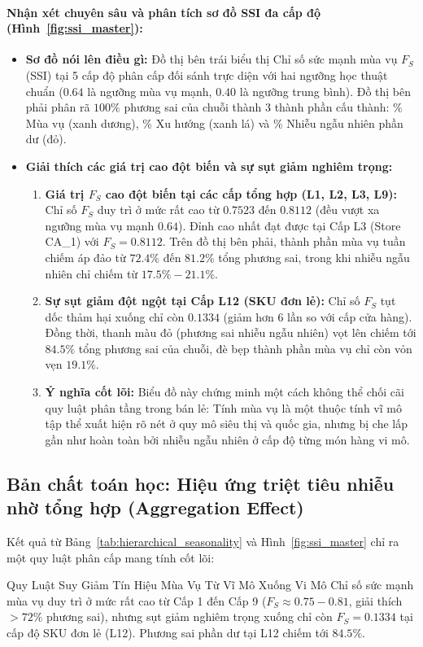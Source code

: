 \documentclass[12pt,a4paper,oneside]{article}
\begin{document}
\paragraph{Nhận xét chuyên sâu và phân tích sơ đồ SSI đa cấp độ (Hình~\ref{fig:ssi_master}):}
\begin{itemize}
    \item \textbf{Sơ đồ nói lên điều gì:} Đồ thị bên trái biểu thị Chỉ số sức mạnh mùa vụ $F_S$ (SSI) tại 5 cấp độ phân cấp đối sánh trực diện với hai ngưỡng học thuật chuẩn ($0.64$ là ngưỡng mùa vụ mạnh, $0.40$ là ngưỡng trung bình). Đồ thị bên phải phân rã $100\%$ phương sai của chuỗi thành 3 thành phần cấu thành: \% Mùa vụ (xanh dương), \% Xu hướng (xanh lá) và \% Nhiễu ngẫu nhiên phần dư (đỏ).
    \item \textbf{Giải thích các giá trị cao đột biến và sự sụt giảm nghiêm trọng:}
    \begin{enumerate}
        \item \textbf{Giá trị $F_S$ cao đột biến tại các cấp tổng hợp (L1, L2, L3, L9):} Chỉ số $F_S$ duy trì ở mức rất cao từ $0.7523$ đến $0.8112$ (đều vượt xa ngưỡng mùa vụ mạnh $0.64$). Đỉnh cao nhất đạt được tại Cấp L3 (Store CA\_1) với $F_S = 0.8112$. Trên đồ thị bên phải, thành phần mùa vụ tuần chiếm áp đảo từ $72.4\%$ đến $81.2\%$ tổng phương sai, trong khi nhiễu ngẫu nhiên chỉ chiếm từ $17.5\% - 21.1\%$.
        \item \textbf{Sự sụt giảm đột ngột tại Cấp L12 (SKU đơn lẻ):} Chỉ số $F_S$ tụt dốc thảm hại xuống chỉ còn $0.1334$ (giảm hơn 6 lần so với cấp cửa hàng). Đồng thời, thanh màu đỏ (phương sai nhiễu ngẫu nhiên) vọt lên chiếm tới $84.5\%$ tổng phương sai của chuỗi, đè bẹp thành phần mùa vụ chỉ còn vỏn vẹn $19.1\%$.
        \item \textbf{Ý nghĩa cốt lõi:} Biểu đồ này chứng minh một cách không thể chối cãi quy luật phân tầng trong bán lẻ: Tính mùa vụ là một thuộc tính vĩ mô tập thể xuất hiện rõ nét ở quy mô siêu thị và quốc gia, nhưng bị che lấp gần như hoàn toàn bởi nhiễu ngẫu nhiên ở cấp độ từng món hàng vi mô.
    \end{enumerate}
\end{itemize}

\subsection{Bản chất toán học: Hiệu ứng triệt tiêu nhiễu nhờ tổng hợp (Aggregation Effect)}
Kết quả từ Bảng~\ref{tab:hierarchical_seasonality} và Hình~\ref{fig:ssi_master} chỉ ra một quy luật phân cấp mang tính cốt lõi:
\begin{keyinsight}{Quy Luật Suy Giảm Tín Hiệu Mùa Vụ Từ Vĩ Mô Xuống Vi Mô}
    Chỉ số sức mạnh mùa vụ duy trì ở mức rất cao từ Cấp 1 đến Cấp 9 ($F_S \approx 0.75 - 0.81$, giải thích $> 72\%$ phương sai), nhưng sụt giảm nghiêm trọng xuống chỉ còn $F_S = 0.1334$ tại cấp độ SKU đơn lẻ (L12). Phương sai phần dư tại L12 chiếm tới $84.5\%$.
\end{keyinsight}
\end{document}
